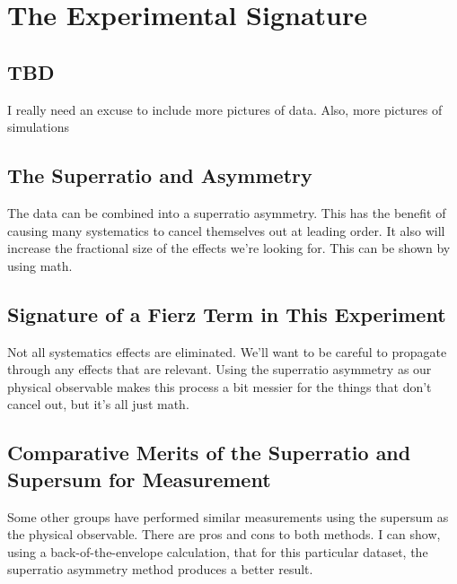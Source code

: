 

\clearpage	

\chapter{The Experimental Signature}
\label{analysis_chapter}

\section{TBD}

I really need an excuse to include more pictures of data.  Also, more pictures of simulations






\section{The Superratio and Asymmetry}
The data can be combined into a superratio asymmetry.  This has the benefit of causing many systematics to cancel themselves out at leading order.  It also will increase the fractional size of the effects we're looking for.  This can be shown by using math.  

\section{Signature of a Fierz Term in This Experiment}
Not all systematics effects are eliminated.  We'll want to be careful to propagate through any effects that are relevant.  Using the superratio asymmetry as our physical observable makes this process a bit messier for the things that don't cancel out, but it's all just math.  

\section{Comparative Merits of the Superratio and Supersum for Measurement}
Some other groups have performed similar measurements using the supersum as the physical observable.  There are pros and cons to both methods.  I can show, using a back-of-the-envelope calculation, that for this particular dataset, the superratio asymmetry method produces a better result.  

